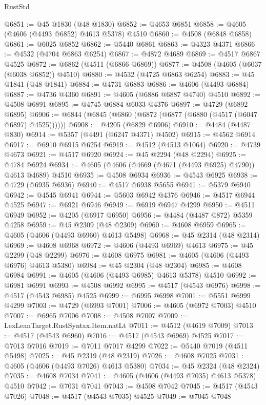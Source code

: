 \begin{lexlean}{RustStd}
\begin{coremodule}
@6851 := @45 @1830 (@48 @1830)
@6852 := @4653 @6851
@6858 := @4605 (@4606 (@4493 @6852) @4613 @5378) @4510
@6860 := @4508 (@6848 @6858)
@6861 := @6025 @6852
@6862 := @5440 @6861
@6863 := @4323 @4371
@6866 := @4532 (@4704 @6863 @6254)
@6867 := @4872 @4689
@6869 := @4517 @6867 @4525
@6872 := @6862 (@4511 (@6866 @6869))
@6877 := @4508 (@4605 (@6037 (@6038 @6852)) @4510)
@6880 := @4532 (@4725 @6863 @6254)
@6883 := @45 @1841 (@48 @1841)
@6884 := @4731 @6883
@6886 := @4606 (@4493 @6884)
@6887 := @4736 @4360
@6891 := @4605 (@6886 @6887 @4740) @4510
@6892 := @4508 @6891
@6895 := @4745 @6884 @6033 @4376
@6897 := @4729 (@6892 @6895)
@6906 := @6844 (@6845 (@6860 (@6872 (@6877 (@6880 (@4517 (@6047 @6897) @4525))))))
@6908 := @4205 (@6829 @6906)
@6910 := @4484 (@4487 @830)
@6914 := @5357 (@4491 (@6247 @4371) @4502)
@6915 := @4562 @6914
@6917 := @6910 @6915 @6254
@6919 := @4512 (@4513 @1064)
@6920 := @4739 @4673
@6921 := @4517 @6920
@6924 := @45 @2294 (@48 @2294)
@6925 := @4784 @6924
@6934 := @4605 (@4606 (@4669 (@4671 (@4493 @6925) @4790)) @4613 @4689) @4510
@6935 := @4508 @6934
@6936 := @4543 @6925
@6938 := @4729 (@6935 @6936)
@6940 := @4517 @6938 @5655
@6941 := @5379 @6940
@6942 := @4545 @6941
@6944 := @5603 @6942 @4376
@6946 := @4517 @6944 @4525
@6947 := @6921 @6946
@6949 := @6919 @6947 @4299
@6950 := @4511 @6949
@6952 := @4205 (@6917 @6950)
@6956 := @4484 (@4487 @872) @5359 @4258
@6959 := @45 @2309 (@48 @2309)
@6960 := @4608 @6959
@6965 := @4605 (@4606 (@4493 @6960) @4613 @5498)
@6968 := @45 @2314 (@48 @2314)
@6969 := @4608 @6968
@6972 := @4606 (@4493 @6969) @4613
@6975 := @45 @2299 (@48 @2299)
@6976 := @4608 @6975
@6981 := @4605 (@4606 (@4493 @6976) @4613 @5380)
@6984 := @45 @2304 (@48 @2304)
@6985 := @4608 @6984
@6991 := @4605 (@4606 (@4493 @6985) @4613 @5378) @4510
@6992 := @6981 @6991
@6993 := @4508 @6992
@6995 := @4517 (@4543 @6976)
@6998 := @4517 (@4543 @6985) @4525
@6999 := @6995 @6998
@7001 := @5551 @6999 @4299
@7003 := @4729 (@6993 @7001)
@7006 := @4605 (@6972 @7003) @4510
@7007 := @6965 @7006
@7008 := @4508 @7007
@7009 := LexLeanTarget.RustSyntax.Item.natLt
@7011 := @4512 (@4619 @7009)
@7013 := @4517 (@4543 @6960)
@7016 := @4517 (@4543 @6969) @4525
@7017 := @7013 @7016
@7019 := @7011 @7017 @4299
@7022 := @5440 @7019 (@4511 @5498)
@7025 := @45 @2319 (@48 @2319)
@7026 := @4608 @7025
@7031 := @4605 (@4606 (@4493 @7026) @4613 @5380)
@7034 := @45 @2324 (@48 @2324)
@7035 := @4608 @7034
@7041 := @4605 (@4606 (@4493 @7035) @4613 @5378) @4510
@7042 := @7031 @7041
@7043 := @4508 @7042
@7045 := @4517 (@4543 @7026)
@7048 := @4517 (@4543 @7035) @4525
@7049 := @7045 @7048

\end{coremodule}
\end{lexlean}
